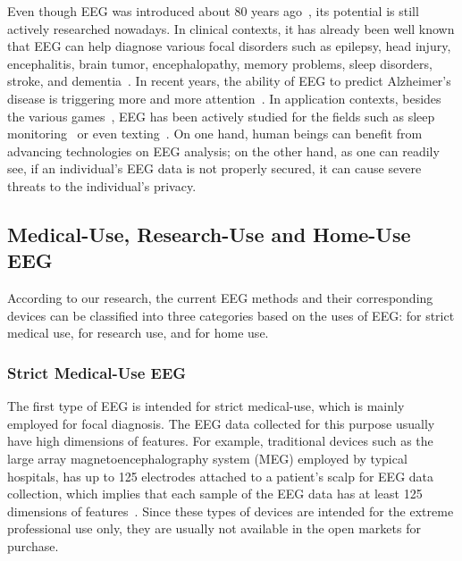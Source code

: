 \indent Even though EEG was introduced about 80 years ago~\cite{swartz1998advantages}, its potential is still actively researched nowadays. In clinical contexts, it has already been well known that EEG can help diagnose various focal disorders such as epilepsy, head injury, encephalitis, brain tumor, encephalopathy, memory problems, sleep disorders, stroke, and dementia~\cite{eegdiagnosis}. In recent years, the ability of EEG to predict Alzheimer's disease is triggering more and more attention~\cite{dauwels2010diagnosis}. In application contexts, besides the various games~\cite{coyle2011eeg}, EEG has been actively studied for the fields such as sleep monitoring~\cite{nakamura2017automatic} or even texting~\cite{zhang2017converting}. On one hand, human beings can benefit from advancing technologies on EEG analysis; on the other hand, as one can readily see, if an individual's EEG data is not properly secured, it can cause severe threats to the individual's privacy.

\subsection{Medical-Use, Research-Use and Home-Use EEG}
According to our research, the current EEG methods and their corresponding devices can be classified into three categories based on the uses of EEG: for strict medical use, for research use, and for home use.

\subsubsection{Strict Medical-Use EEG}
The first type of EEG is intended for strict medical-use, which is mainly employed for focal diagnosis. The EEG data collected for this purpose usually have high dimensions of features. For example, traditional devices such as the large array magnetoencephalography system (MEG) employed by typical hospitals, has up to 125 electrodes attached to a patient's scalp for EEG data collection, which implies that each sample of the EEG data has at least 125 dimensions of features~\cite{lantz2003epileptic}. Since these types of devices are intended for the extreme professional use only, they are usually not available in the open markets for purchase.

